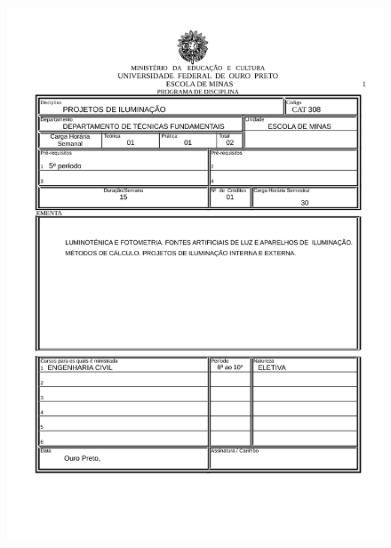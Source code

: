 \begin{figure}[p]
	\centering 
	\includegraphics[scale=0.7]{capitulos/anexo1-programas-disciplina/eg34.pdf}
\end{figure}

